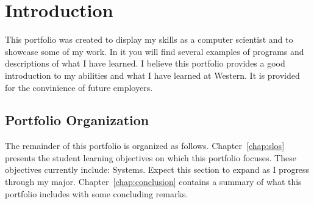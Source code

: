 \chapter{Introduction}\label{chap:introduction}
This portfolio was created to display my skills as a computer scientist and to
showcase some of my work. In it you will find several examples of programs and
descriptions of what I have learned. I believe this portfolio provides a good 
introduction to my abilities and what I have learned at Western. It is provided
for the convinience of future employers.
\section{Portfolio Organization}
The remainder of this portfolio is organized as follows. Chapter~\ref{chap:slos}
presents the student learning objectives on which this portfolio focuses. These 
objectives currently include: Systems. Expect this section to expand as I 
progress through my major. Chapter~\ref{chap:conclusion} contains a summary of 
what this portfolio includes with some concluding remarks.

